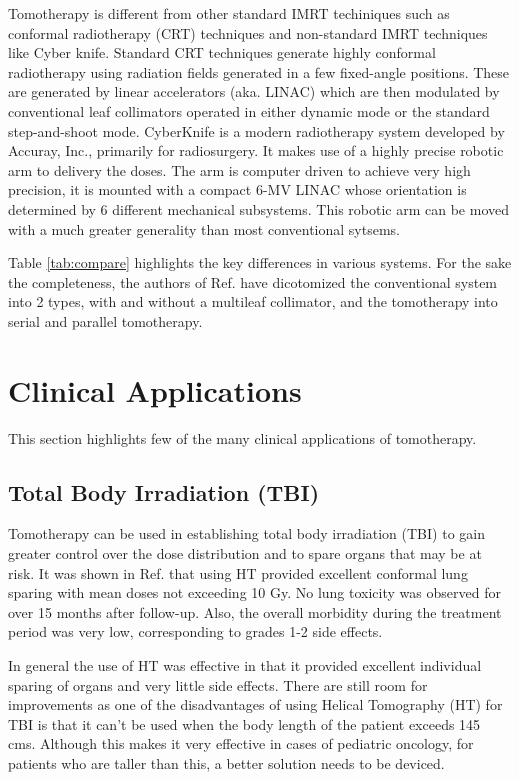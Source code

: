 \documentclass[10pt,journal,compsoc]{IEEEtran} %
\begin{document}
  Tomotherapy is different from other standard IMRT techiniques such as 
  conformal radiotherapy (CRT) techniques and non-standard IMRT techniques like 
  Cyber knife.   Standard CRT techniques generate highly conformal radiotherapy 
  using radiation fields generated in a few fixed-angle positions. These are 
  generated by linear accelerators (aka. LINAC) which are then modulated by 
  conventional leaf collimators operated in either dynamic mode or the standard 
  step-and-shoot mode. CyberKnife is a modern radiotherapy system developed by 
  Accuray, Inc., primarily for radiosurgery. It makes use of a highly precise 
  robotic arm to delivery the doses. The arm is computer driven to achieve very 
  high precision, it is mounted with a compact 6-MV LINAC whose orientation is 
  determined by 6 different mechanical subsystems. This robotic arm can be 
  moved with a much greater generality than most conventional sytsems. 
  
  Table \ref{tab:compare} highlights the key differences in various systems. 
  For the 
  sake the completeness, the authors of Ref. \cite{Fenwick2006} have 
  dicotomized the conventional system into 2 types, with and without a 
  multileaf collimator, and the tomotherapy into serial and parallel 
  tomotherapy.
  \section{Clinical Applications}
  \label{clinical}
  This section highlights few of the many clinical applications of tomotherapy. 
  \subsection{Total Body Irradiation (TBI)}
  Tomotherapy can be used in establishing total body irradiation (TBI) to gain 
  greater control over the dose distribution and to spare organs that may be at 
  risk. It was shown in Ref. \cite{Gruen2013} that using HT provided excellent 
  conformal 
  lung sparing with mean doses not exceeding 10 Gy. No lung toxicity was 
  observed for over 15 months after follow-up. Also, the overall morbidity 
  during the treatment period was very low, corresponding to grades 1-2 side 
  effects.
  
  In general the use of HT was effective in that it provided excellent 
  individual sparing of organs and very little side effects. There are still 
  room for improvements as one of the disadvantages of using Helical Tomography 
  (HT) for TBI is that it 
  can't be used when the body length of the patient exceeds 145 cms. Although 
  this makes it very effective in cases of pediatric oncology, for 
  patients who are taller than this, a better solution needs to be deviced.
  
\end{document}
